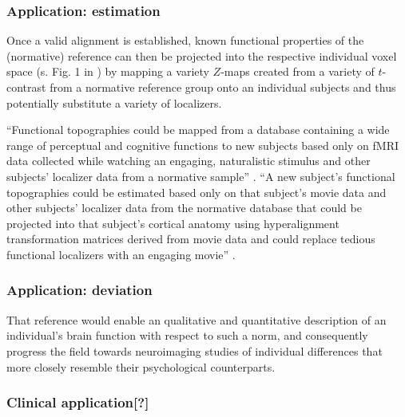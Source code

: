 \subsubsection{Application: estimation}
%
Once a valid alignment is established, known functional properties of the
(normative) reference can then be projected into the respective individual voxel
space (s. Fig. 1 in \citep{nishimoto2016lining}) by mapping a variety $Z$-maps
created from a variety of $t$-contrast from a normative reference group onto an
individual subjects and thus potentially substitute a variety of localizers.

%
``Functional topographies could be mapped from a database containing a wide
range of perceptual and cognitive functions to new subjects based only on fMRI
data collected while watching an engaging, naturalistic stimulus and other
subjects' localizer data from a normative sample'' \citep{jiahui2020predicting}.
%
``A new subject's functional topographies could be estimated based only on that
subject's movie data and other subjects' localizer data from the normative
database that could be projected into that subject's cortical anatomy using
hyperalignment transformation matrices derived from movie data and could replace
tedious functional localizers with an engaging movie''
\citep{jiahui2020predicting}.




\subsubsection{Application: deviation}


%
That reference would enable an qualitative and quantitative description of an
individual's brain function with respect to such a norm, and consequently
progress the field towards neuroimaging studies of individual differences that
more closely resemble their psychological counterparts.


\subsubsection{Clinical application[?]}






